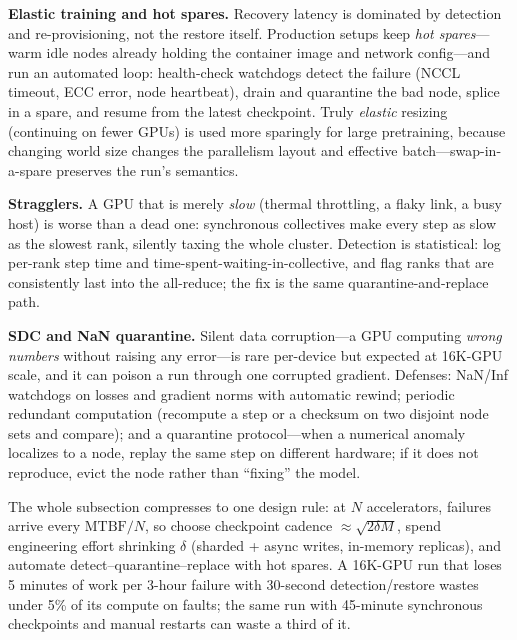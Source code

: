 \textbf{Elastic training and hot spares.} Recovery latency is dominated by detection and re-provisioning, not the restore itself. Production setups keep \emph{hot spares}---warm idle nodes already holding the container image and network config---and run an automated loop: health-check watchdogs detect the failure (NCCL timeout, ECC error, node heartbeat), drain and quarantine the bad node, splice in a spare, and resume from the latest checkpoint. Truly \emph{elastic} resizing (continuing on fewer GPUs) is used more sparingly for large pretraining, because changing world size changes the parallelism layout and effective batch---swap-in-a-spare preserves the run's semantics.

\textbf{Stragglers.} A GPU that is merely \emph{slow} (thermal throttling, a flaky link, a busy host) is worse than a dead one: synchronous collectives make every step as slow as the slowest rank, silently taxing the whole cluster. Detection is statistical: log per-rank step time and time-spent-waiting-in-collective, and flag ranks that are consistently last into the all-reduce; the fix is the same quarantine-and-replace path.

\textbf{SDC and NaN quarantine.} Silent data corruption---a GPU computing \emph{wrong numbers} without raising any error---is rare per-device but expected at 16K-GPU scale, and it can poison a run through one corrupted gradient. Defenses: NaN/Inf watchdogs on losses and gradient norms with automatic rewind; periodic redundant computation (recompute a step or a checksum on two disjoint node sets and compare); and a quarantine protocol---when a numerical anomaly localizes to a node, replay the same step on different hardware; if it does not reproduce, evict the node rather than ``fixing'' the model.

\begin{keyinsight}
The whole subsection compresses to one design rule: at $N$ accelerators, failures arrive every $\text{MTBF}/N$, so choose checkpoint cadence $\approx \sqrt{2\delta M}$, spend engineering effort shrinking $\delta$ (sharded + async writes, in-memory replicas), and automate detect--quarantine--replace with hot spares. A 16K-GPU run that loses 5 minutes of work per 3-hour failure with 30-second detection/restore wastes under 5\% of its compute on faults; the same run with 45-minute synchronous checkpoints and manual restarts can waste a third of it.
\end{keyinsight}

